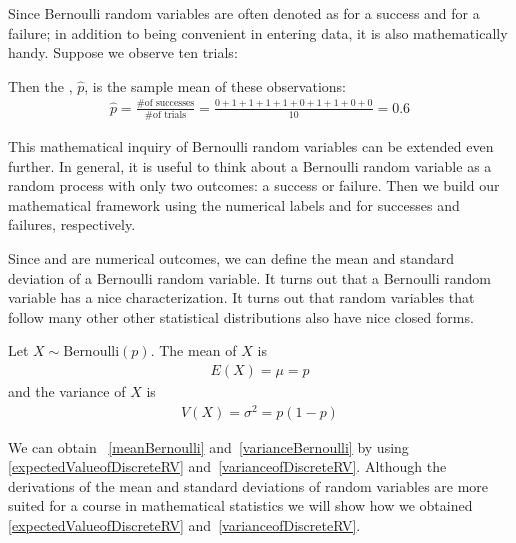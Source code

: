 Since Bernoulli random variables are often denoted as  for a success and  for a failure; in addition to being convenient in entering data, it is also mathematically handy. Suppose we observe ten trials:
\begin{center}
         
\end{center}
Then the , $\hat{p}$, is the sample mean of these observations:
\begin{eqnarray*}
\hat{p} = \frac{\text{\# of successes}}{\text{\# of trials}} = \frac{0+1+1+1+1+0+1+1+0+0}{10} = 0.6
\end{eqnarray*}%


This mathematical inquiry of Bernoulli random variables can be extended even further. 
In general, it is useful to think about a Bernoulli random variable as a random process with only two outcomes: a success or failure. Then we build our mathematical framework using the numerical labels  and  for successes and failures, respectively.


Since  and  are numerical outcomes, we can define the {mean} and {standard deviation} of a Bernoulli random variable.
It turns out that a Bernoulli random variable has a nice characterization.
It turns out that random variables that follow many other other statistical distributions also have nice closed forms.

\begin{termBox}{
Let $X \sim \text{Bernoulli}(p)$. 
The mean of $X$ is
\begin{align}
E(X) = \mu = p	\label{meanBernoulli}
\end{align}
and the variance of $X$ is
\begin{align}
V(X) = \sigma^{2} = p(1-p)	\label{varianceBernoulli}
\end{align}
}
\end{termBox}


We can obtain ~\ref{meanBernoulli} and~\ref{varianceBernoulli} by using
\ref{expectedValueofDiscreteRV} and~\ref{varianceofDiscreteRV}.
Although the derivations of the mean and standard deviations of random variables are
more suited for a course in mathematical statistics we will show how we obtained
\ref{expectedValueofDiscreteRV} and~\ref{varianceofDiscreteRV}.

